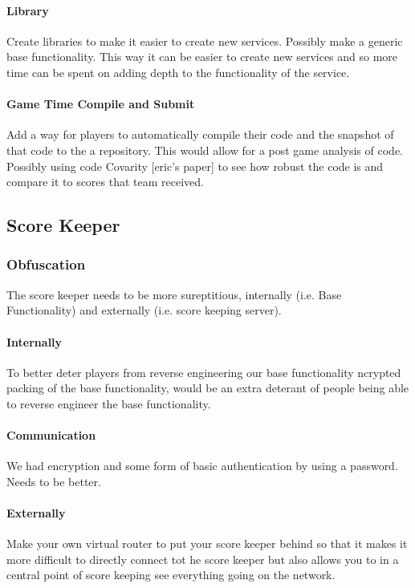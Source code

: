 \documentclass[10pt]{article}
\begin{document}
\paragraph*{Library}
Create libraries to make it easier to create new services. Possibly make a generic base
functionality. This way it can be easier to create new services and so more time can
be spent on adding depth to the functionality of the service.

\paragraph*{Game Time Compile and Submit}
Add a way for players to automatically compile their code and the snapshot of that code
to the a repository. This would allow for a post game analysis of code. Possibly using
code Covarity [eric's paper] to see how robust the code is and compare it to scores
that team received.

\subsection{Score Keeper}

\subsubsection{Obfuscation}
The score keeper needs to be more sureptitious, internally (i.e. Base Functionality) and
externally (i.e. score keeping server).

\paragraph*{Internally}
To better deter players from reverse engineering our base functionality ncrypted packing of the base functionality, would be an extra deterant of people being
able to reverse engineer the base functionality.

\paragraph*{Communication}
We had encryption and some form of basic authentication by using a password.
Needs to be better.

\paragraph*{Externally}
Make your own virtual router to put your score keeper behind so that it makes it
more difficult to directly connect tot he score keeper but also allows you to in a central
point of score keeping see everything going on the network.
\end{document}
